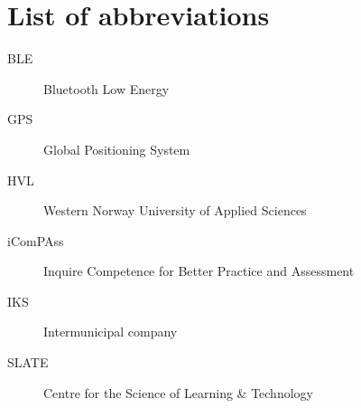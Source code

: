 \documentclass[../Main/thesis.tex]{subfiles}
\begin{document}
\chapter*{List of abbreviations}
\begin{description}
\item[BLE] Bluetooth Low Energy
\item[GPS] Global Positioning System
\item[HVL] Western Norway University of Applied Sciences
\item[iComPAss] Inquire Competence for Better Practice and Assessment
\item[IKS] Intermunicipal company
\item[SLATE] Centre for the Science of Learning \& Technology
\end{description}

\blankpage
\end{document}
